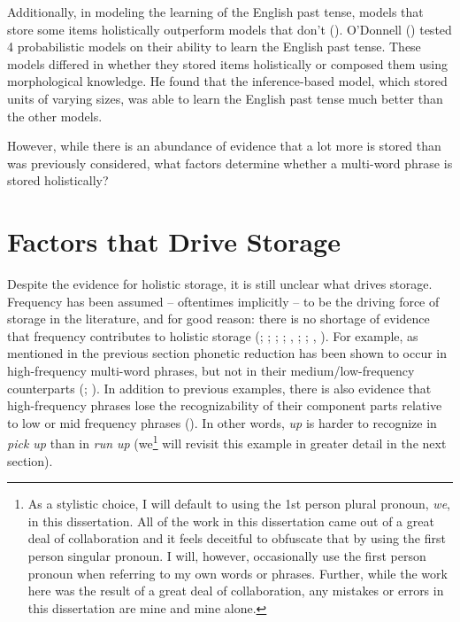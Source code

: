 \documentclass[
  12pt,
  letterpaper,
]{scrreport}
\begin{document}
Additionally, in modeling the learning of the English past tense, models
that store some items holistically outperform models that don't
().
O'Donnell ()
tested 4 probabilistic models on their ability to learn the English past
tense. These models differed in whether they stored items holistically
or composed them using morphological knowledge. He found that the
inference-based model, which stored units of varying sizes, was able to
learn the English past tense much better than the other models.

However, while there is an abundance of evidence that a lot more is
stored than was previously considered, what factors determine whether a
multi-word phrase is stored holistically?

\section{Factors that Drive
Storage}\label{sec-factors-that-drive-storage}

Despite the evidence for holistic storage, it is still unclear what
drives storage. Frequency has been assumed -- oftentimes implicitly --
to be the driving force of storage in the literature, and for good
reason: there is no shortage of evidence that frequency contributes to
holistic storage (;
;
;
; ,
;
; ,
). For example, as
mentioned in the previous section phonetic reduction has been shown to
occur in high-frequency multi-word phrases, but not in their
medium/low-frequency counterparts (; ). In addition to previous examples, there is also evidence that
high-frequency phrases lose the recognizability of their component parts
relative to low or mid frequency phrases
(). In other words, \emph{up} is harder to recognize in
\emph{pick up} than in \emph{run up} (we\footnote{As a stylistic choice,
  I will default to using the 1st person plural pronoun, \emph{we}, in
  this dissertation. All of the work in this dissertation came out of a
  great deal of collaboration and it feels deceitful to obfuscate that
  by using the first person singular pronoun. I will, however,
  occasionally use the first person pronoun when referring to my own
  words or phrases. Further, while the work here was the result of a
  great deal of collaboration, any mistakes or errors in this
  dissertation are mine and mine alone.} will revisit this example in
greater detail in the next section).
\end{document}

